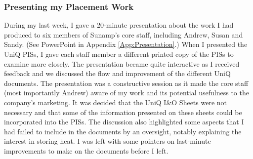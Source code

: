 




\subsubsection{Presenting my Placement Work}

During my last week, I gave a 20-minute presentation about the work I had produced to six members of Sunamp's core staff, including Andrew, Susan and Sandy.
(See PowerPoint in Appendix \ref{App:Presentation}.)
When I presented the UniQ PISs, I gave each staff member a different printed copy of the PISs to examine more closely.
The presentation became quite interactive as I received feedback and we discussed the flow and improvement of the different UniQ documents.
The presentation was a constructive session as it made the core staff (most importantly Andrew) aware of my work and its potential usefulness to the company's marketing.
It was decided that the UniQ I\&O Sheets were not necessary and that some of the information presented on these sheets could be incorporated into the PISs.
The discussion also highlighted some aspects that I had failed to include in the documents by an oversight, notably explaining the interest in storing heat.
I was left with some pointers on last-minute improvements to make on the documents before I left.



